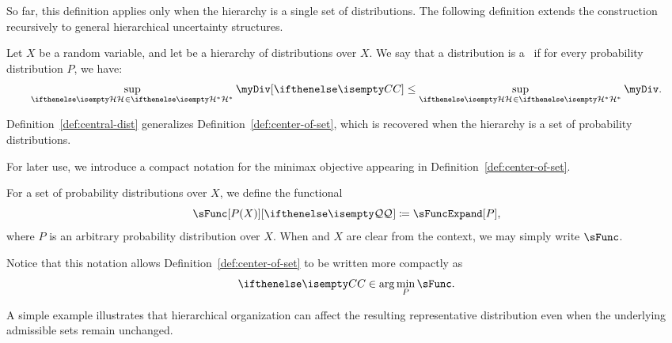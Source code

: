 So far, this definition applies only when the hierarchy is a single set of distributions.
The following definition extends the construction recursively to general hierarchical uncertainty structures.

\begin{definition}
    \label{def:central-dist}
    Let $X$ be a random variable, and let \setQQ be a hierarchy of distributions over $X$.
    We say that a distribution \cDist is a \emph{\cd[X][\setQQ]}\ if
    for every probability distribution $P$, we have:
    \begin{equation*}
        \sup_{\set{H} \in \setQQ} \myDiv[\cDist]  \leq \sup_{\set{H} \in \setQQ} \myDiv.
    \end{equation*}
\end{definition}

Definition~\ref{def:central-dist} generalizes Definition~\ref{def:center-of-set}, which is recovered when the hierarchy
is a set of probability distributions.

For later use, we introduce a compact notation for the minimax objective appearing in
Definition~\ref{def:center-of-set}.
\begin{notation}
    For a set of probability distributions \setQ over $X$, we define the functional
    \[
        \sFunc[P(X)][\setQ] \coloneqq \sFuncExpand[P],
    \]
    where $P$ is an arbitrary probability distribution over $X$.
    When \setQ and $X$ are clear from the context, we may simply write $\sFunc$.
\end{notation}
Notice that this notation allows Definition~\ref{def:center-of-set} to be written more compactly as
\[
    \cDist \in \arg\min_{P} \sFunc.
\]

A simple example illustrates that hierarchical organization can affect the resulting representative distribution
even when the underlying admissible sets remain unchanged.

